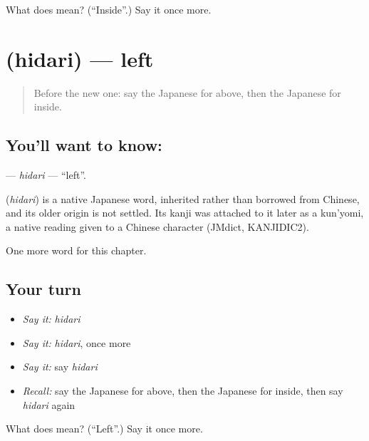 \begin{tcolorbox}[breakable,colback=teal!4,colframe=teal!35!black,title={Before you move on}]
What does  mean? (\textquotedblleft{}Inside\textquotedblright{}.) Say it once more.
\end{tcolorbox}
\section[\texorpdfstring{\ja{ひだり} (hidari)}{ひだり (hidari)}]{ (hidari) — left}

\label{lesson:JA-C56-hidari}



\begin{quote}
Before the new one: say the Japanese for above, then the Japanese for inside.
\end{quote}

\subsection*{You'll want to know: }
\textbf{} — \emph{hidari} — \textquotedblleft{}left\textquotedblright{}.

\begin{cousinweb}
\textbf{} (\emph{hidari}) is a native Japanese word, inherited rather than borrowed from Chinese, and its older origin is not settled. Its kanji was attached to it later as a kun'yomi, a native reading given to a Chinese character (JMdict, KANJIDIC2).
\end{cousinweb}

\begin{grammarlens}[title={What you've built}]
One more word for this chapter.
\end{grammarlens}

\subsection*{Your turn}
\begin{itemize}
\raggedright
  \item \emph{Say it:} \emph{hidari}
  \item \emph{Say it:} \emph{hidari}, once more
  \item \emph{Say it:} say \emph{hidari}
  \item \emph{Recall:} say the Japanese for above, then the Japanese for inside, then say \emph{hidari} again
\end{itemize}

\begin{tcolorbox}[breakable,colback=teal!4,colframe=teal!35!black,title={Before you move on}]
What does  mean? (\textquotedblleft{}Left\textquotedblright{}.) Say it once more.
\end{tcolorbox}
